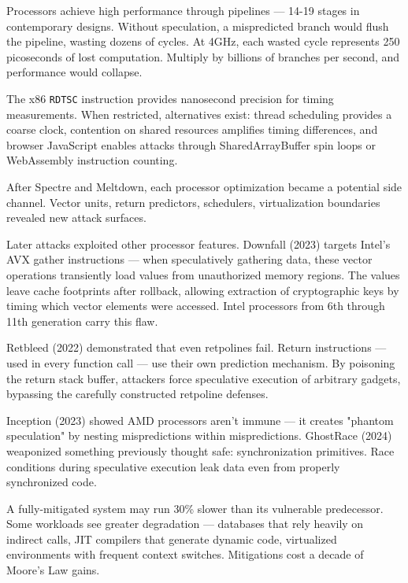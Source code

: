 Processors achieve high performance through pipelines — 14-19 stages in contemporary designs. Without speculation, a mispredicted branch would flush the pipeline, wasting dozens of cycles. At 4GHz, each wasted cycle represents 250 picoseconds of lost computation. Multiply by billions of branches per second, and performance would collapse.

The x86 \texttt{RDTSC} instruction provides nanosecond precision for timing measurements. When restricted, alternatives exist: thread scheduling provides a coarse clock, contention on shared resources amplifies timing differences, and browser JavaScript enables attacks through SharedArrayBuffer spin loops or WebAssembly instruction counting.

After Spectre and Meltdown, each processor optimization became a potential side channel. Vector units, return predictors, schedulers, virtualization boundaries revealed new attack surfaces.

Later attacks exploited other processor features. Downfall (2023) targets Intel's AVX gather instructions — when speculatively gathering data, these vector operations transiently load values from unauthorized memory regions. The values leave cache footprints after rollback, allowing extraction of cryptographic keys by timing which vector elements were accessed. Intel processors from 6th through 11th generation carry this flaw.

Retbleed (2022) demonstrated that even retpolines fail. Return instructions — used in every function call — use their own prediction mechanism. By poisoning the return stack buffer, attackers force speculative execution of arbitrary gadgets, bypassing the carefully constructed retpoline defenses.

Inception (2023) showed AMD processors aren't immune — it creates "phantom speculation" by nesting mispredictions within mispredictions. GhostRace (2024) weaponized something previously thought safe: synchronization primitives. Race conditions during speculative execution leak data even from properly synchronized code.

A fully-mitigated system may run 30\% slower than its vulnerable predecessor. Some workloads see greater degradation — databases that rely heavily on indirect calls, JIT compilers that generate dynamic code, virtualized environments with frequent context switches. Mitigations cost a decade of Moore's Law gains.

